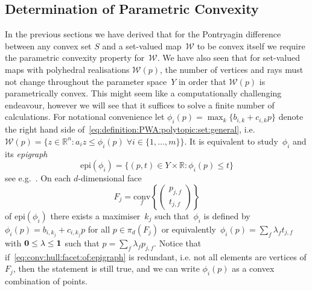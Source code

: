 \documentclass[final]{elsarticle}
\providecommand{\conv}{\text{conv}}
\providecommand{\epi}{\text{epi}}
\theoremstyle{remark}
\theoremstyle{definition}
\begin{document}
\subsection{Determination of Parametric Convexity}
In the previous sections we have derived that for the Pontryagin difference between any convex set $S$ and a set-valued map~$\mathcal W$ to be convex itself we require the parametric convexity property for~$\mathcal W$.
%
We have also seen that for set-valued maps with polyhedral realisations $\mathcal W(p)$, the number of vertices and rays must not change throughout the parameter space~$Y$ in order that $\mathcal W(p)$ is parametrically convex.
%
This might seem like a computationally challenging endeavour, however we will see that it suffices to solve a finite number of calculations.
%
For notational convenience let $\phi_i(p) = \max_k\{b_{i,k}+c_{i,k}p\}$ denote the right hand side of~\eqref{eq:definition:PWA:polytopic:set:general}, i.e. $\mathcal W(p) = \{z\in\mathbb R^n: a_i z\leq \phi_i(p)\;\forall i\in\{1,\dots,m\}\}$.
%
It is equivalent to study~$\phi_i$ and its \emph{epigraph} 
%
$$
	\epi(\phi_i) = \{(p,t)\in Y\times\mathbb R: \phi_i(p)\leq t\}
$$
%
see e.g.~\cite{Gorokhovik:1993}.
%
On each $d$-dimensional face 
%
\begin{equation}\label{eq:conv:hull:facet:of:epigraph}
F_j = \underset{f}{\conv}\left\{\left(\begin{array}{c}p_{j,f}\\ t_{j,f}\end{array}\right)\right\}
\end{equation}
%
of $\epi(\phi_i)$ there exists a maximiser~$k_j$ such that~$\phi_i$ is defined by~$\phi_i(p)=b_{i,k_j}+c_{i,k_j}p$ for all $p\in\pi_d(F_j)$ or equivalently~$\phi_i(p)=\sum_{f}\lambda_f t_{j,f}$ with ${\bf{0}}\leq\lambda\leq{\bf{1}}$ such that $p=\sum_{f}\lambda_f p_{j,f}$.
%
Notice that if~\eqref{eq:conv:hull:facet:of:epigraph} is redundant, i.e. not all elements are vertices of $F_j$, then the statement is still true, and we can write $\phi_i(p)$ as a convex combination of points.
\end{document}
